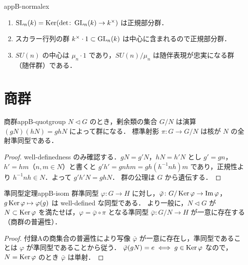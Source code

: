 \begin{myex}{}{appB-normalex}
\begin{enumerate}
\item $\operatorname{SL}_n(k)=\operatorname{Ker}(\det\colon\operatorname{GL}_n(k)\to k^\times)$ は正規部分群．
\item スカラー行列の群 $k^\times\cdot1\subset\operatorname{GL}_n(k)$ は中心に含まれるので正規部分群．
\item $SU(n)$ の中心は $\mu_n\cdot 1$ であり，$SU(n)/\mu_n$ は随伴表現が忠実になる群（随伴群）である．
\end{enumerate}
\end{myex}

\section{商群}

\begin{mythm}{商群}{appB-quotgroup}
$N\triangleleft G$ のとき，剰余類の集合 $G/N$ は演算 $(gN)(hN)=ghN$ によって群になる．
標準射影 $\pi\colon G\to G/N$ は核が $N$ の全射準同型である．
\end{mythm}
\begin{proof}
well-definedness のみ確認する．$gN=g'N$，$hN=h'N$ とし $g'=gn$，$h'=hm$（$n,m\in N$）と書くと
$g'h'=gnhm=gh(h^{-1}nh)m$ であり，正規性より $h^{-1}nh\in N$．よって $g'h'N=ghN$．
群の公理は $G$ から遺伝する．
\end{proof}

\begin{mythm}{準同型定理}{appB-isom}
群準同型 $\varphi\colon G\to H$ に対し，$\bar\varphi\colon G/\operatorname{Ker}\varphi\to\operatorname{Im}\varphi$，$g\operatorname{Ker}\varphi\mapsto\varphi(g)$ は
well-defined な同型である．
より一般に，$N\triangleleft G$ が $N\subset\operatorname{Ker}\varphi$ を満たせば，$\varphi=\bar\varphi\circ\pi$ となる準同型
$\bar\varphi\colon G/N\to H$ が一意に存在する（商群の普遍性）．
\end{mythm}
\begin{proof}
付録Aの商集合の普遍性により写像 $\bar\varphi$ が一意に存在し，準同型であることは $\varphi$ が準同型であることから従う．
$\bar\varphi(gN)=e\iff g\in\operatorname{Ker}\varphi$ なので，$N=\operatorname{Ker}\varphi$ のとき $\bar\varphi$ は単射．
\end{proof}

